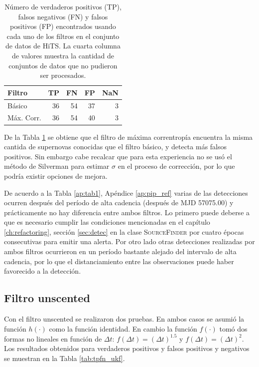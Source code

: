 \begin{table}[h!]
\centering
\caption{N\'umero de verdaderos positivos (TP), falsos negativos (FN) y falsos positivos (FP) encontrados usando cada uno de los filtros en el conjunto de datos de HiTS. La cuarta columna de valores muestra la cantidad de conjuntos de datos que no pudieron ser procesados.}
\begin{tabular}{|l|r|r|r|r|}
\hline
\textbf{Filtro} & \textbf{TP} & \textbf{FN} & \textbf{FP} & \textbf{NaN}\\ \hline
Básico          & 36          & 54          & 37 &  3 \\ \hline
M\'ax. Corr.             & 36          & 54          & 40  & 3 \\ \hline
\end{tabular}
\label{tab:tpfn_new}
\end{table}
\bigskip

De la Tabla \ref{tab:tpfn_new} se obtiene que el filtro de m\'axima correntrop\'ia encuentra la misma cantida de supernovas conocidas que el filtro b\'asico, y detecta m\'as falsos positivos. Sin embargo cabe recalcar que para esta experiencia no se us\'o el m\'etodo de Silverman para estimar $\sigma$ en el proceso de correcci\'on, por lo que podr\'ia existir opciones de mejora.
\bigskip

De acuerdo a la Tabla \ref{ap:tab1}, Ap\'endice \ref{ap:pip_ref} varias de las detecciones ocurren despu\'es  del per\'iodo de alta cadencia (despu\'es de MJD 57075.00) y pr\'acticamente no hay diferencia entre ambos filtros. Lo primero puede deberse a que es necesario cumplir las condiciones mencionadas en el cap\'itulo \ref{ch:refactoring}, secci\'on \ref{sec:detec} en la clase \textsc{SourceFinder} por cuatro \'epocas consecutivas para emitir una alerta. Por otro lado otras detecciones realizadas por ambos filtros ocurrieron en un per\'iodo bastante alejado del intervalo de alta cadencia, por lo que el distanciamiento entre las observaciones puede haber favorecido a la detecci\'on.
\bigskip
  

\subsection{Filtro unscented}
Con el filtro unscented se realizaron dos pruebas. En ambos casos se asumi\'o la funci\'on $h(\cdot)$ como la funci\'on identidad. En cambio la funci\'on $f(\cdot)$ tom\'o dos formas no lineales en funci\'on de $\Delta t$: $f(\Delta t) = (\Delta t)^{1.5}$ y $f(\Delta t) = (\Delta t)^{2}$. Los resultados obtenidos para verdaderos positivos y falsos positivos y negativos se muestran en la Tabla \ref{tab:tpfn_ukf}.

